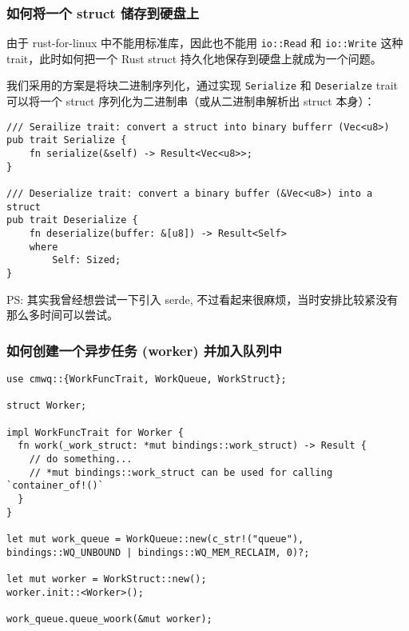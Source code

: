 \subsubsection{如何将一个 struct 储存到硬盘上}

由于 rust-for-linux 中不能用标准库，因此也不能用 \texttt{io::Read} 和 \texttt{io::Write} 这种 trait，此时如何把一个 Rust struct 持久化地保存到硬盘上就成为一个问题。

我们采用的方案是将块二进制序列化，通过实现 \texttt{Serialize} 和 \texttt{Deserialze} trait 可以将一个 struct 序列化为二进制串（或从二进制串解析出 struct 本身）：

\begin{verbatim}
/// Serailize trait: convert a struct into binary bufferr (Vec<u8>)
pub trait Serialize {
    fn serialize(&self) -> Result<Vec<u8>>;
}

/// Deserialize trait: convert a binary buffer (&Vec<u8>) into a struct
pub trait Deserialize {
    fn deserialize(buffer: &[u8]) -> Result<Self>
    where
        Self: Sized;
}
\end{verbatim}

PS: 其实我曾经想尝试一下引入 serde, 不过看起来很麻烦，当时安排比较紧没有那么多时间可以尝试。

\subsubsection{如何创建一个异步任务 (worker) 并加入队列中}

\begin{verbatim}
use cmwq::{WorkFuncTrait, WorkQueue, WorkStruct};

struct Worker;

impl WorkFuncTrait for Worker {
  fn work(_work_struct: *mut bindings::work_struct) -> Result {
    // do something...
    // *mut bindings::work_struct can be used for calling `container_of!()`
  }
}

let mut work_queue = WorkQueue::new(c_str!("queue"), bindings::WQ_UNBOUND | bindings::WQ_MEM_RECLAIM, 0)?;

let mut worker = WorkStruct::new();
worker.init::<Worker>();

work_queue.queue_woork(&mut worker);

\end{verbatim}